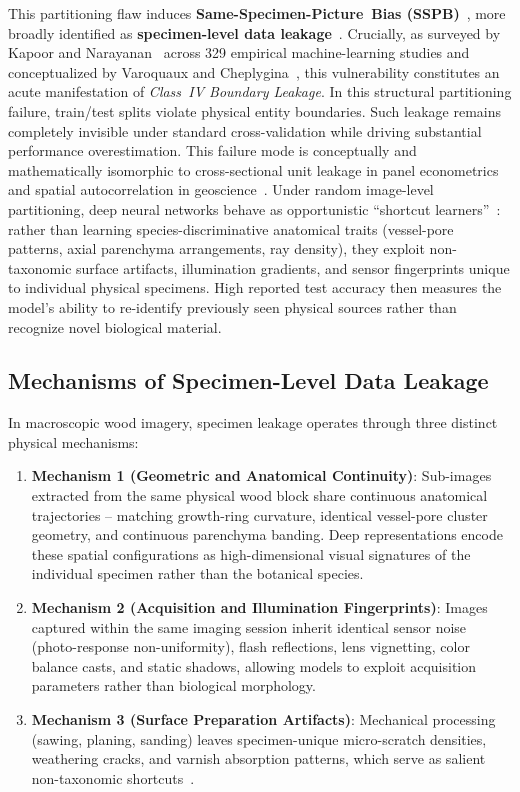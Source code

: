 \documentclass[a4paper,fleqn]{cas-sc}
\begin{document}
This partitioning flaw induces \textbf{\mbox{Same-Specimen-Picture Bias} (SSPB)}~\cite{figueroamata2022}, more broadly identified as \textbf{specimen-level data leakage}~\cite{varoquaux2022,roberts2021,kapoor2023}. Crucially, as surveyed by Kapoor and Narayanan~\cite{kapoor2023} across 329 empirical machine-learning studies and conceptualized by Varoquaux and Cheplygina~\cite{varoquaux2022}, this vulnerability constitutes an acute manifestation of \emph{Class~IV Boundary Leakage}. In this structural partitioning failure, train/test splits violate physical entity boundaries. Such leakage remains completely invisible under standard cross-validation while driving substantial performance overestimation. This failure mode is conceptually and mathematically isomorphic to cross-sectional unit leakage in panel econometrics~\cite{cerqua2026,babii2024} and spatial autocorrelation in geoscience~\cite{roberts2017}. Under random image-level partitioning, deep neural networks behave as opportunistic ``shortcut learners''~\cite{geirhos2020}: rather than learning species-discriminative anatomical traits (vessel-pore patterns, axial parenchyma arrangements, ray density), they exploit non-taxonomic surface artifacts, illumination gradients, and sensor fingerprints unique to individual physical specimens. High reported test accuracy then measures the model's ability to re-identify previously seen physical sources rather than recognize novel biological material.

\subsection{Mechanisms of Specimen-Level Data Leakage}
In macroscopic wood imagery, specimen leakage operates through three distinct physical mechanisms:
\begin{enumerate}
\item \textbf{Mechanism 1 (Geometric and Anatomical Continuity)}: Sub-images extracted from the same physical wood block share continuous anatomical trajectories -- matching growth-ring curvature, identical vessel-pore cluster geometry, and continuous parenchyma banding. Deep representations encode these spatial configurations as high-dimensional visual signatures of the individual specimen rather than the botanical species.
\item \textbf{Mechanism 2 (Acquisition and Illumination Fingerprints)}: Images captured within the same imaging session inherit identical sensor noise (photo-response non-uniformity), flash reflections, lens vignetting, color balance casts, and static shadows, allowing models to exploit acquisition parameters rather than biological morphology.
\item \textbf{Mechanism 3 (Surface Preparation Artifacts)}: Mechanical processing (sawing, planing, sanding) leaves specimen-unique micro-scratch densities, weathering cracks, and varnish absorption patterns, which serve as salient non-taxonomic shortcuts~\cite{geirhos2020}.
\end{enumerate}
\end{document}
